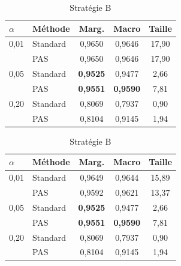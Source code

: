 \documentclass[12pt,a4paper]{article}
\begin{document}
\begin{table}[H]
    \centering
    \small
    \renewcommand{\arraystretch}{1.1}
    
    \begin{minipage}{0.48\textwidth}
        \centering
        \caption{Stratégie A}
        \label{tab:strat_A}
        \begin{tabular}{|l|l|c|c|c|}
            \hline
            \textbf{$\alpha$} & \textbf{Méthode} & \textbf{Marg.} & \textbf{Macro} & \textbf{Taille} \\
            \hline
            0,01 & Standard & 0,9650 & 0,9646 & 17,90 \\
                 & PAS      & 0,9650 & 0,9646 & 17,90 \\
            \hline
            0,05 & Standard & \textbf{0,9525} & 0,9477 & 2,66 \\
                 & PAS      & \textbf{0,9551} & \textbf{0,9590} & 7,81 \\
            \hline
            0,20 & Standard & 0,8069 & 0,7937 & 0,90 \\
                 & PAS      & 0,8104 & 0,9145 & 1,94 \\
            \hline
        \end{tabular}
    \end{minipage}
    \hfill
    \begin{minipage}{0.48\textwidth}
        \centering
        \caption{Stratégie B}
        \label{tab:strat_B}
        \begin{tabular}{|l|l|c|c|c|}
            \hline
            \textbf{$\alpha$} & \textbf{Méthode} & \textbf{Marg.} & \textbf{Macro} & \textbf{Taille} \\
            \hline
            0,01 & Standard & 0,9649 & 0,9644 & 15,89 \\
                 & PAS      & 0,9592 & 0,9621 & 13,37 \\
            \hline
            0,05 & Standard & \textbf{0,9525} & 0,9477 & 2,66 \\
                 & PAS      & \textbf{0,9551} & \textbf{0,9590} & 7,81 \\
            \hline
            0,20 & Standard & 0,8069 & 0,7937 & 0,90 \\
                 & PAS      & 0,8104 & 0,9145 & 1,94 \\
            \hline
        \end{tabular}
    \end{minipage}
\end{table}
\end{document}
